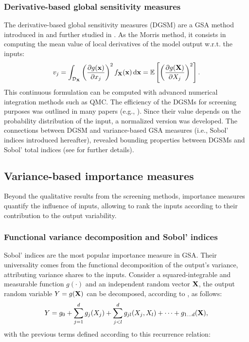 \subsubsection{Derivative-based global sensitivity measures}

The derivative-based global sensitivity measures (DGSM) are a GSA method introduced in \citet{sobol_1995_DGSM} and further studied in \citet{kucherenko_2009_DGSM}. 
As the Morris method, it consists in computing the mean value of local derivatives of the model output w.r.t. the inputs: 
\begin{equation}
    v_j = \int_{\mathcal{D}_{{\bf X}}} \left(\frac{\partial g({\bf x})}{\partial x_j}\right)^2 f_{{\bf X}}({\bf x}) \, \mathrm{d} {\bf x} = \mathbb{E}\left[\left(\frac{\partial g({\bf X})}{\partial X_j}\right)^2\right].
\end{equation}
This continuous formulation can be computed with advanced numerical integration methods such as QMC. 
The efficiency of the DGSMs for screening purposes was outlined in many papers (e.g., \citealp{kucherenko_iooss_2017}). 
Since their value depends on the probability distribution of the input, a normalized version was developed. 
The connections between DGSM and variance-based GSA measures (i.e., Sobol' indices introduced hereafter), revealed bounding properties between DGSMs and Sobol' total indices (see \citealp{roustant_2017} for further details).

\subsection{Variance-based importance measures}

Beyond the qualitative results from the screening methods, importance measures quantify the influence of inputs, allowing to rank the inputs according to their contribution to the output variability.  


\subsubsection{Functional variance decomposition and Sobol' indices}
Sobol' indices are the most popular importance measure in GSA. 
Their universality comes from the functional decomposition of the output's variance, attributing variance shares to the inputs. 
Consider a squared-integrable and measurable function $g(\cdot)$ and an independent random vector ${\bf X}$, 
the output random variable $Y = g({\bf X})$ can be decomposed, according to \citet{hoeffding_1948}, as follows: 
\begin{equation}
    Y = g_0 + \sum_{j=1}^{d} g_j(X_j) + \sum_{j<l}^{d} g_{jl}(X_j, X_l) + \dots + g_{1 \dots d}({\bf X}),
    \label{eq:hoeffding}
\end{equation}
with the previous terms defined according to this recurrence relation:  

